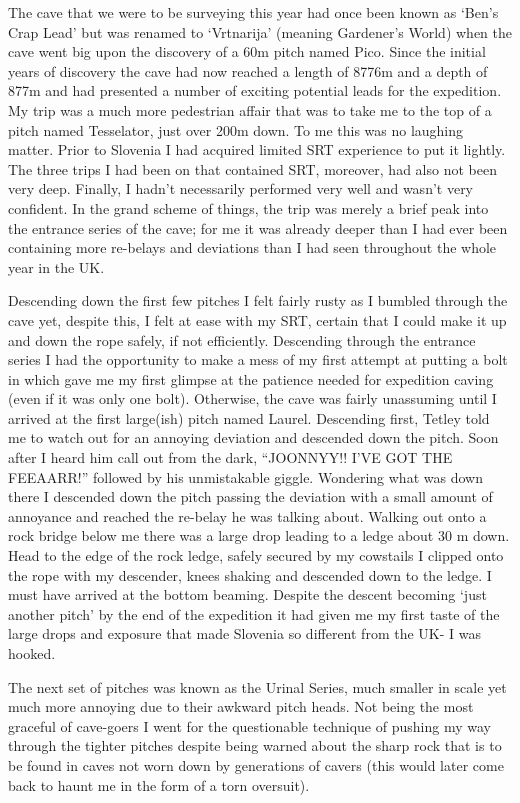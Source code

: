 The cave that we were to be surveying this year had once been known as
`Ben's Crap Lead' but was renamed to `Vrtnarija' (meaning Gardener's
World) when the cave went big upon the discovery of a 60m pitch named
Pico. Since the initial years of discovery the cave had now reached a
length of 8776m and a depth of 877m and had presented a number of
exciting potential leads for the expedition. My trip was a much more
pedestrian affair that was to take me to the top of a pitch named
Tesselator, just over 200m down. To me this was no laughing matter.
Prior to Slovenia I had acquired limited SRT experience to put it
lightly. The three trips I had been on that contained SRT, moreover, had
also not been very deep. Finally, I hadn't necessarily performed very
well and wasn't very confident. In the grand scheme of things, the trip
was merely a brief peak into the entrance series of the cave; for me it
was already deeper than I had ever been containing more re-belays and
deviations than I had seen throughout the whole year in the UK.

Descending down the first few pitches I felt fairly rusty as I bumbled
through the cave yet, despite this, I felt at ease with my SRT, certain
that I could make it up and down the rope safely, if not efficiently.
Descending through the entrance series I had the opportunity to make a
mess of my first attempt at putting a bolt in which gave me my first
glimpse at the patience needed for expedition caving (even if it was
only one bolt). Otherwise, the cave was fairly unassuming until I
arrived at the first large(ish) pitch named Laurel. Descending first,
Tetley told me to watch out for an annoying deviation and descended down
the pitch. Soon after I heard him call out from the dark, ``JOONNYY!!
I'VE GOT THE FEEAARR!'' followed by his unmistakable giggle. Wondering
what was down there I descended down the pitch passing the deviation
with a small amount of annoyance and reached the re-belay he was talking
about. Walking out onto a rock bridge below me there was a large drop
leading to a ledge about 30 m down. Head to the edge of the rock ledge,
safely secured by my cowstails I clipped onto the rope with my
descender, knees shaking and descended down to the ledge. I must have
arrived at the bottom beaming. Despite the descent becoming `just
another pitch' by the end of the expedition it had given me my first
taste of the large drops and exposure that made Slovenia so different
from the UK- I was hooked.

The next set of pitches was known as the Urinal Series, much smaller in
scale yet much more annoying due to their awkward pitch heads. Not being
the most graceful of cave-goers I went for the questionable technique of
pushing my way through the tighter pitches despite being warned about
the sharp rock that is to be found in caves not worn down by generations
of cavers (this would later come back to haunt me in the form of a torn
oversuit).

